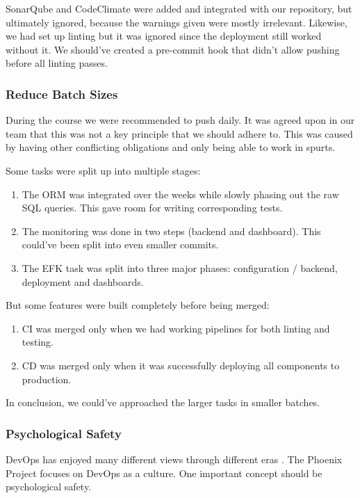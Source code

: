 \documentclass{article}
\begin{document}
SonarQube and CodeClimate were added and integrated with our repository, but ultimately ignored, because the warnings given were mostly irrelevant. Likewise, we had set up linting but it was ignored since the deployment still worked without it. We should've created a pre-commit hook that didn't allow pushing before all linting passes. 

\subsubsection{Reduce Batch Sizes}

During the course we were recommended to push daily. It was agreed upon in our team that this was not a key principle that we should adhere to. This was caused by having other conflicting obligations and only being able to work in spurts. 

Some tasks were split up into multiple stages:

\begin{enumerate}
    \item The ORM was integrated over the weeks while slowly phasing out the raw SQL queries. This gave room for writing corresponding tests. 
    \item The monitoring was done in two steps (backend and dashboard). This could've been split into even smaller commits. 
    \item The EFK task was split into three major phases: configuration / backend, deployment and dashboards.
\end{enumerate}

\noindent But some features were built completely before being merged:

\begin{enumerate}
    \item CI was merged only when we had working pipelines for both linting and testing.
    \item CD was merged only when it was successfully deploying all components to production.
\end{enumerate}

In conclusion, we could've approached the larger tasks in smaller batches.

\subsubsection{Psychological Safety}

DevOps has enjoyed many different views through different eras \cite{devopsviewsthrougheras}. The Phoenix Project \cite{thephoenixproject} focuses on DevOps as a culture. One important concept should be psychological safety.
\end{document}
